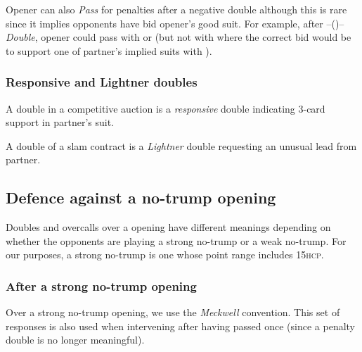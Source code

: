 \documentclass[a4paper,article,oneside]{memoir}
\newcommand{\hcp}{\textsc{hcp}}
\begin{document}
Opener can also \emph{Pass} for penalties after a negative double
although this is rare since it implies opponents have bid opener's
good suit. For example, after --()--\emph{Double}, opener
could pass with  or 
(but not with  where the correct bid would be
to support one of partner's implied suits with ).

\subsubsection{Responsive and Lightner doubles}

A double in a competitive auction is a \emph{responsive} double
indicating 3-card support in partner's suit.

A double of a slam contract is a \emph{Lightner} double requesting an
unusual lead from partner.

\subsection{Defence against a no-trump opening}

Doubles and overcalls over a  opening have different meanings
depending on whether the opponents are playing a strong no-trump or a
weak no-trump. For our purposes, a strong no-trump is one whose point
range includes 15\hcp.

\subsubsection{After a strong no-trump opening}

Over a strong no-trump opening, we use the \emph{Meckwell}
convention. This set of responses is also used when intervening after
having passed once (since a penalty double is no longer meaningful).
\end{document}
